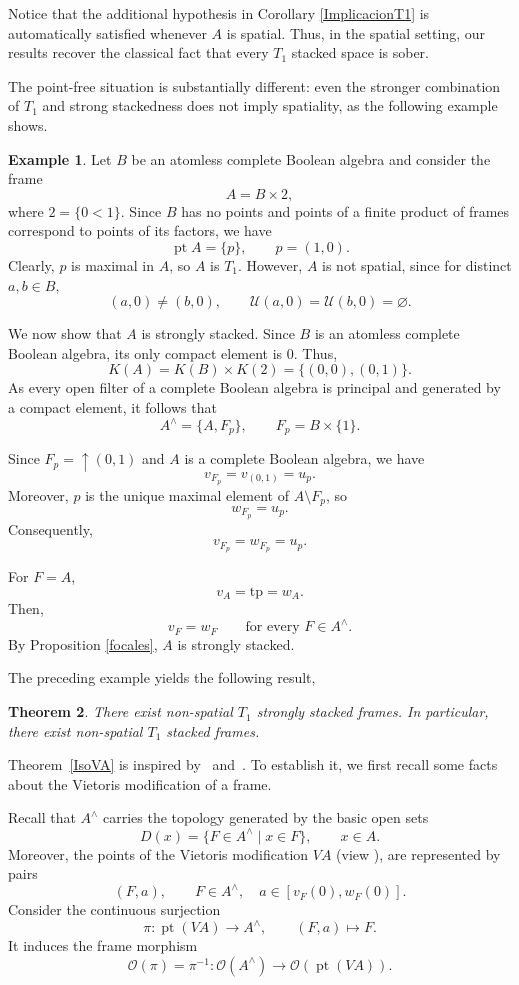\documentclass[11pt]{amsart}
\DeclareMathOperator{\pt}{pt}
\theoremstyle{plain}
\newtheorem{thm}{Theorem}[section]
\theoremstyle{definition}
\newtheorem{ej}[thm]{Example}
\begin{document}
Notice that the additional hypothesis in Corollary \ref{ImplicacionT1} 
is automatically satisfied whenever $A$ is spatial. Thus, in the spatial 
setting, our results recover the classical fact that every $T_1$ 
stacked space is sober.

The point-free situation is substantially
different: even the stronger combination
of $T_1$ and strong stackedness does not
imply spatiality, as the following example
shows.

\begin{ej}\label{T1+S no espacial}
Let $B$ be an atomless complete Boolean algebra
and consider the frame
\[
A=B\times 2,
\]
where $2=\{0<1\}$. Since $B$ has no points
and points of a finite product of frames
correspond to points of its factors, we have
\[
\pt A=\{p\},\qquad p=(1,0).
\]
Clearly, $p$ is maximal in $A$, so $A$ is
$T_1$. However, $A$ is not spatial, since
for distinct $a,b\in B$,
\[
(a,0)\neq(b,0),
\qquad
\mathcal U(a,0)=\mathcal U(b,0)=\varnothing.
\]

We now show that $A$ is strongly stacked.
Since $B$ is an atomless complete Boolean
algebra, its only compact element is $0$.
Thus,
\[
K(A)=K(B)\times K(2)
=\{(0,0),(0,1)\}.
\]
As every open filter of a complete Boolean
algebra is principal and generated by a
compact element, it follows that
\[
A^\wedge=\{A,F_p\},
\qquad F_p=B\times\{1\}.
\]

Since $F_p=\uparrow(0,1)$ and $A$ is a complete
Boolean algebra, we have
\[
v_{F_p}=v_{(0,1)}=u_p.
\]
Moreover, $p$ is the unique maximal element
of $A\setminus F_p$, so
\[
w_{F_p}=u_p.
\]
Consequently,
\[
v_{F_p}=w_{F_p}=u_p.
\]

For $F=A$,
\[
v_A=\mathrm{tp}=w_A.
\]
Then,
\[
v_F=w_F
\qquad\text{for every }F\in A^\wedge.
\]
By Proposition \ref{focales}, $A$ is
strongly stacked.
\end{ej}

The preceding example yields the following result,

\begin{thm}
There exist non-spatial $T_1$ strongly stacked
frames. In particular, there exist non-spatial
$T_1$ stacked frames.
\end{thm}

Theorem~\ref{IsoVA} is inspired by~\cite[Theorem 7.4]{sexton2006ordinal}
and~\cite[Section 4-7]{simmons2004vietoris}.
To establish it, we first recall some facts
about the Vietoris modification of a frame.

Recall that $A^\wedge$ carries the topology
generated by the basic open sets
\[
D(x)=\{F\in A^\wedge\mid x\in F\},
\qquad x\in A.
\]
Moreover, the points of the Vietoris
modification $VA$ (view \cite{johnstone2020vietoris}), are represented by pairs
\[
(F,a),\qquad F\in A^\wedge,\quad
a\in[v_F(0),w_F(0)].
\]
Consider the continuous surjection
\[
\pi:\pt(VA)\longrightarrow A^\wedge,
\qquad (F,a)\longmapsto F.
\]
It induces the frame morphism
\[
\mathcal{O}(\pi)=\pi^{-1}\colon
\mathcal{O}(A^\wedge)\longrightarrow
\mathcal{O}(\pt(VA)).
\]
\end{document}

